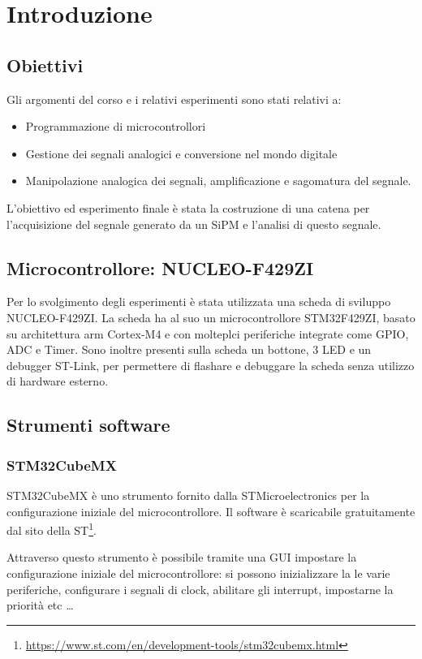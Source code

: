 \chapter*{Introduzione}

\section*{Obiettivi}
Gli argomenti del corso e i relativi esperimenti sono stati relativi a:
\begin{itemize}
    \item Programmazione di microcontrollori
    \item Gestione dei segnali analogici e conversione nel mondo digitale
    \item Manipolazione analogica dei segnali, amplificazione e sagomatura del segnale.
\end{itemize}

L'obiettivo ed esperimento finale è stata la costruzione di una catena per l'acquisizione del segnale generato da un SiPM e l'analisi di questo segnale.

\section*{Microcontrollore: NUCLEO-F429ZI}
Per lo svolgimento degli esperimenti è stata utilizzata una scheda di sviluppo NUCLEO-F429ZI.
La scheda ha al suo un microcontrollore STM32F429ZI, basato su architettura arm Cortex-M4 e con molteplci periferiche integrate come GPIO, ADC e Timer. Sono inoltre presenti sulla scheda un bottone, 3 LED e un debugger ST-Link, per permettere di flashare e debuggare la scheda senza utilizzo di hardware esterno.


\section*{Strumenti software}
\subsection*{STM32CubeMX}
STM32CubeMX è uno strumento fornito dalla STMicroelectronics per la configurazione iniziale del microcontrollore. 
Il software è scaricabile gratuitamente dal sito della ST\footnote{\href{https://www.st.com/en/development-tools/stm32cubemx.html}{https://www.st.com/en/development-tools/stm32cubemx.html}}.


Attraverso questo strumento è possibile tramite una GUI impostare la configurazione iniziale del microcontrollore: si possono inizializzare la le varie periferiche, configurare i segnali di clock, abilitare gli interrupt, impostarne la priorità etc \dots

